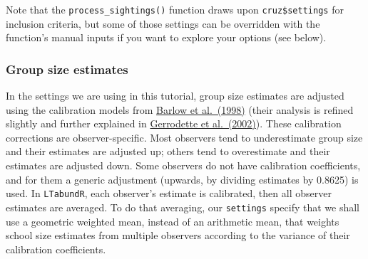 \documentclass[
]{book}
\newenvironment{Shaded}{\begin{snugshade}}{\end{snugshade}}
\newcommand{\ConstantTok}[1]{\textcolor[rgb]{0.56,0.35,0.01}{#1}}
\newcommand{\DecValTok}[1]{\textcolor[rgb]{0.00,0.00,0.81}{#1}}
\newcommand{\ErrorTok}[1]{\textcolor[rgb]{0.64,0.00,0.00}{\textbf{#1}}}
\newcommand{\NormalTok}[1]{#1}
\newcommand{\SpecialCharTok}[1]{\textcolor[rgb]{0.81,0.36,0.00}{\textbf{#1}}}
\newcommand{\StringTok}[1]{\textcolor[rgb]{0.31,0.60,0.02}{#1}}
\begin{document}
\begin{Shaded}
\end{Shaded}

Note that the \texttt{process\_sightings()} function draws upon \texttt{cruz\$settings} for inclusion criteria, but some of those settings can be overridden with the function's manual inputs if you want to explore your options (see below).

\hypertarget{ss_calibration}{%
\subsubsection*{Group size estimates}\label{ss_calibration}}

In the settings we are using in this tutorial, group size estimates are adjusted using the calibration models from \href{https://repository.library.noaa.gov/view/noaa/25848}{Barlow et al.~(1998)} (their analysis is refined slightly and further explained in \href{https://www.academia.edu/download/45586682/lj_02_08.pdf}{Gerrodette et al.~(2002)}). These calibration corrections are observer-specific. Most observers tend to underestimate group size and their estimates are adjusted up; others tend to overestimate and their estimates are adjusted down. Some observers do not have calibration coefficients, and for them a generic adjustment (upwards, by dividing estimates by 0.8625) is used. In \texttt{LTabundR}, each observer's estimate is calibrated, then all observer estimates are averaged. To do that averaging, our \texttt{settings} specify that we shall use a geometric weighted mean, instead of an arithmetic mean, that weights school size estimates from multiple observers according to the variance of their calibration coefficients.
\end{document}
